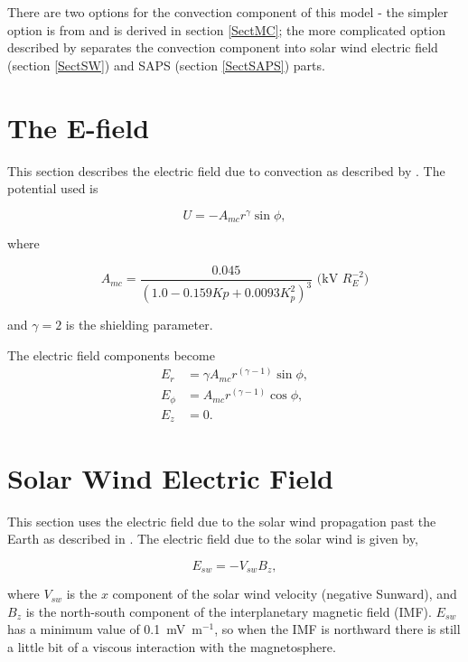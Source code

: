 \documentclass[]{article}
\begin{document}
There are two options for the convection component of this model - the simpler option is from \citet{Maynard1975} and is derived in section \ref{SectMC}; the more complicated option described by \citet{Goldstein2005} separates the convection component into solar wind electric field (section \ref{SectSW}) and SAPS (section \ref{SectSAPS}) parts.


\section{The \citet{Maynard1975} $\mathbf{E}$-field}

This section describes the electric field due to convection as described by \citet{Maynard1975}. The potential used is

\begin{equation}
	U = -A_{mc} r^\gamma \sin{\phi}, \label{EqMCPot}
\end{equation}

where 

\begin{equation}
	A_{mc} = \frac{0.045}{(1.0 - 0.159 Kp + 0.0093 K_p^2)^3} \text{ (kV $R_E^{-2}$)}
\end{equation}

and $\gamma=2$ is the shielding parameter.

The electric field components become
\begin{align}
	E_r &= \gamma A_{mc} r^{(\gamma-1)}\sin{\phi},\\
	E_\phi &= A_{mc} r^{(\gamma-1)} \cos{\phi},\\
	E_z &= 0.
\end{align}

\section{Solar Wind Electric Field}

This section uses the electric field due to the solar wind propagation past the Earth as described in \citet{Goldstein2005}. The electric field due to the solar wind is given by,

\begin{equation}
	E_{sw} = -V_{sw} B_z,
\end{equation}

where $V_{sw}$ is the $x$ component of the solar wind velocity (negative Sunward), and $B_z$ is the north-south component of the interplanetary magnetic field (IMF). $E_{sw}$ has a minimum value of 0.1~mV~m$^{-1}$, so when the IMF is northward there is still a little bit of a viscous interaction with the magnetosphere.
\end{document}
